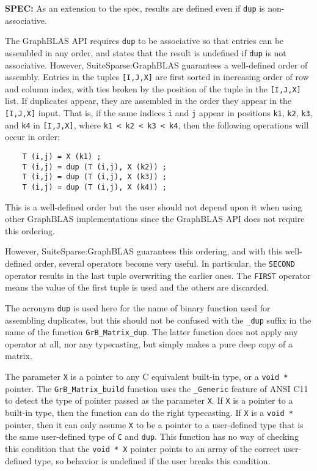 \documentclass[12pt]{article}
\begin{document}
\begin{spec}
{\bf SPEC:} As an extension to the spec, results are defined even if \verb'dup' is non-associative.
\end{spec}

The GraphBLAS API requires \verb'dup' to be associative so
that entries can be assembled in any order, and states that the result is
undefined if \verb'dup' is not associative.  However, SuiteSparse:GraphBLAS
guarantees a well-defined order of assembly.  Entries in the tuples
\verb'[I,J,X]' are first sorted in increasing order of row and column index,
with ties broken by the position of the tuple in the \verb'[I,J,X]' list.  If
duplicates appear, they are assembled in the order they appear in the
\verb'[I,J,X]' input.  That is, if the same indices \verb'i' and \verb'j'
appear in positions \verb'k1', \verb'k2', \verb'k3', and \verb'k4' in
\verb'[I,J,X]', where \verb'k1 < k2 < k3 < k4', then the following operations
will occur in order:

    {\footnotesize
    \begin{verbatim}
    T (i,j) = X (k1) ;
    T (i,j) = dup (T (i,j), X (k2)) ;
    T (i,j) = dup (T (i,j), X (k3)) ;
    T (i,j) = dup (T (i,j), X (k4)) ; \end{verbatim}}

This is a well-defined order but the user should not depend upon it when using
other GraphBLAS implementations since the GraphBLAS API does not
require this ordering.

However, SuiteSparse:GraphBLAS guarantees this ordering, and with this
well-defined order, several operators become very useful.  In particular, the
\verb'SECOND' operator results in the last tuple overwriting the earlier ones.
The \verb'FIRST' operator means the value of the first tuple is used and the
others are discarded.

The acronym \verb'dup' is used here for the name of binary function used for
assembling duplicates, but this should not be confused with the \verb'_dup'
suffix in the name of the function \verb'GrB_Matrix_dup'.  The latter function
does not apply any operator at all, nor any typecasting, but simply makes a
pure deep copy of a matrix.

The parameter \verb'X' is a pointer to any C equivalent built-in type, or a
\verb'void *' pointer.  The \verb'GrB_Matrix_build' function uses the
\verb'_Generic' feature of ANSI C11 to detect the type of pointer passed as the
parameter \verb'X'.  If \verb'X' is a pointer to a built-in type, then the
function can do the right typecasting.  If \verb'X' is a \verb'void *' pointer,
then it can only assume \verb'X' to be a pointer to a user-defined type that is
the same user-defined type of \verb'C' and \verb'dup'.  This function has no
way of checking this condition that the \verb'void * X' pointer points to an
array of the correct user-defined type, so behavior is undefined if the user
breaks this condition.
\end{document}
